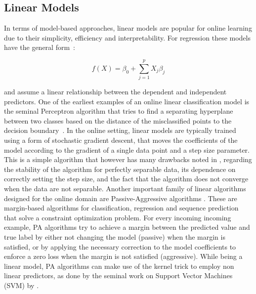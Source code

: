 \subsection*{Linear Models}
In terms of model-based approaches, linear models are popular
for online learning due to their simplicity, efficiency and interpretability.
For regression these models have the general form~\cite{esl}:

\begin{equation}
	f(X) = \beta_0 + \sum_{j=1}^{p}{X_j\beta_j}
\end{equation}

and assume a linear relationship between the dependent and independent predictors.
One of the earliest examples of an online linear classification model is the seminal
Perceptron algorithm \cite{perceptron} that tries to find a separating hyperplane
between two classes based on the distance of the misclassified points to the
decision boundary~\cite{esl}.
In the online setting, linear models are typically trained using a form
of stochastic gradient descent, that moves the coefficients
of the model according to the gradient of a single data point
and a step size parameter.
This is a simple algorithm that however has many drawbacks
noted in \cite{esl}, regarding the stability of the algorithm
for perfectly separable data, its dependence on correctly setting
the step size, and the fact that the algorithm does not
converge when the data are not separable.
Another important family of linear algorithms designed for the online domain
are Passive-Aggressive algorithms \cite{passive-aggressive}.
These are margin-based algorithms for classification, regression and
sequence prediction that solve a constraint optimization problem.
For every incoming incoming example, PA algorithms
try to achieve a margin between the predicted value and true label
by either not changing the model (passive) when the margin is satisfied,
or by applying the necessary correction to the model coefficients
to enforce a zero loss when the margin is not satisfied (aggressive).
While being a linear model, PA algorithms can make use of the kernel trick to
employ non linear predictors, as done by the seminal work
on Support Vector Machines (SVM) by \citet{svm-book}.

